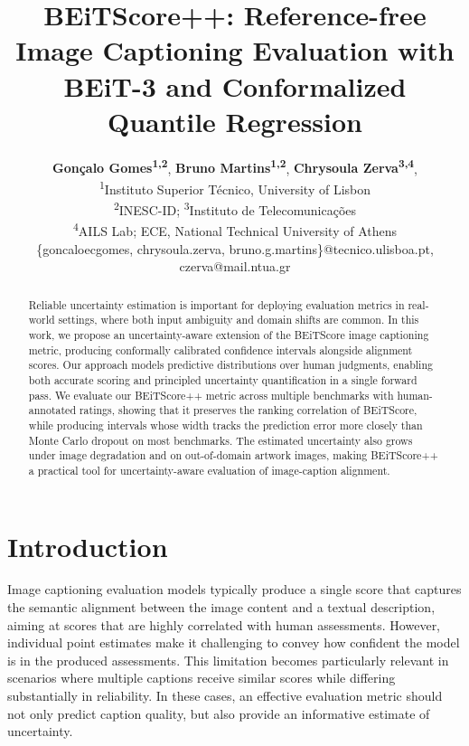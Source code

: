 \documentclass[11pt]{article}
\title{BEiTScore++: Reference-free Image Captioning Evaluation with BEiT-3 and Conformalized Quantile Regression}
\author{
  \textbf{Gonçalo Gomes\textsuperscript{1,2}},
  \textbf{Bruno Martins\textsuperscript{1,2}},
  \textbf{Chrysoula Zerva\textsuperscript{3,4}},
\\
  \textsuperscript{1}Instituto Superior Técnico, University of Lisbon
\\
  \textsuperscript{2}INESC-ID; 
\quad
  \textsuperscript{3}Instituto de Telecomunicações
\\
\textsuperscript{4}AILS Lab; ECE, National Technical University of Athens
\\
  \small{
    {\{goncaloecgomes, chrysoula.zerva, bruno.g.martins\}@tecnico.ulisboa.pt}, czerva@mail.ntua.gr
  }
}
\begin{document}
\maketitle
\begin{abstract}
Reliable uncertainty estimation is important for deploying evaluation metrics in real-world settings, where both input ambiguity and domain shifts are common. In this work, we propose an uncertainty-aware extension of the BEiTScore image captioning metric, producing conformally calibrated confidence intervals alongside alignment scores. Our approach models predictive distributions over human judgments, enabling both accurate scoring and principled uncertainty quantification in a single forward pass. We evaluate our BEiTScore++ metric across multiple benchmarks with human-annotated ratings, showing that it preserves the ranking correlation of BEiTScore, while producing intervals whose width tracks the prediction error more closely than Monte Carlo dropout on most benchmarks. The estimated uncertainty also grows under image degradation and on out-of-domain artwork images, making BEiTScore++ a practical tool for uncertainty-aware evaluation of image-caption alignment.
\end{abstract}

\vspace{-0.13cm}
\section{Introduction}
\vspace{-0.13cm}

Image captioning evaluation models typically produce a single score that captures the semantic alignment between the image content and a textual description, aiming at scores that are highly correlated with human assessments. However, individual point estimates make it challenging to convey how confident the model is in the produced assessments. This limitation becomes particularly relevant in scenarios where multiple captions receive similar scores while differing substantially in reliability. In these cases, an effective evaluation metric should not only predict caption quality, but also provide an informative estimate of uncertainty.
\end{document}
